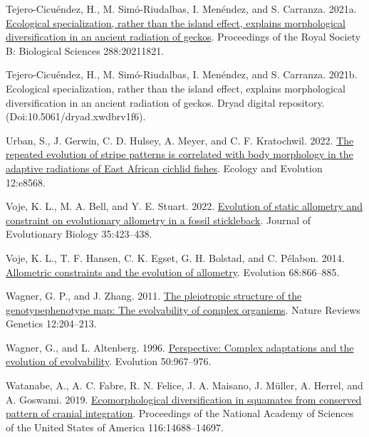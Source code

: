 \documentclass[
  11pt,
]{article}
\newlength{\cslhangindent}
\newlength{\cslentryspacingunit} %
\newenvironment{CSLReferences}[2] %
 {%
  \setlength{\parindent}{0pt}
  \ifodd #1
  \let\oldpar\par
  \def\par{\hangindent=\cslhangindent\oldpar}
  \fi
  \setlength{\parskip}{#2\cslentryspacingunit}
 }%
 {}
\begin{document}
\begin{CSLReferences}{1}{0}
\leavevmode{}%
Tejero-Cicuéndez, H., M. Simó-Riudalbas, I. Menéndez, and S. Carranza.
2021a. \href{https://doi.org/10.1098/rspb.2021.1821}{Ecological
specialization, rather than the island effect, explains morphological
diversification in an ancient radiation of geckos}. Proceedings of the
Royal Society B: Biological Sciences 288:20211821.

\leavevmode{}%
Tejero-Cicuéndez, H., M. Simó-Riudalbas, I. Menéndez, and S. Carranza.
2021b. Ecological specialization, rather than the island effect,
explains morphological diversification in an ancient radiation of
geckos. Dryad digital repository. (Doi:10.5061/dryad.xwdbrv1f6).

\leavevmode{}%
Urban, S., J. Gerwin, C. D. Hulsey, A. Meyer, and C. F. Kratochwil.
2022. \href{https://doi.org/10.1002/ece3.8568}{The repeated evolution of
stripe patterns is correlated with body morphology in the adaptive
radiations of {E}ast {A}frican cichlid fishes}. Ecology and Evolution
12:e8568.

\leavevmode{}%
Voje, K. L., M. A. Bell, and Y. E. Stuart. 2022.
\href{https://doi.org/10.1111/jeb.13984}{Evolution of static allometry
and constraint on evolutionary allometry in a fossil stickleback}.
Journal of Evolutionary Biology 35:423--438.

\leavevmode{}%
Voje, K. L., T. F. Hansen, C. K. Egset, G. H. Bolstad, and C. Pélabon.
2014. \href{https://doi.org/10.1111/evo.12312}{Allometric constraints
and the evolution of allometry}. Evolution 68:866--885.

\leavevmode{}%
Wagner, G. P., and J. Zhang. 2011.
\href{https://doi.org/10.1038/nrg2949}{The pleiotropic structure of the
genotype{\textendash}phenotype map: The evolvability of complex
organisms}. Nature Reviews Genetics 12:204--213.

\leavevmode{}%
Wagner, G., and L. Altenberg. 1996.
\href{https://doi.org/10.1111/j.1558-5646.1996.tb02339.x}{Perspective:
Complex adaptations and the evolution of evolvability}. Evolution
50:967--976.

\leavevmode{}%
Watanabe, A., A. C. Fabre, R. N. Felice, J. A. Maisano, J. Müller, A.
Herrel, and A. Goswami. 2019.
\href{https://doi.org/10.1073/pnas.1820967116}{{Ecomorphological
diversification in squamates from conserved pattern of cranial
integration}}. Proceedings of the National Academy of Sciences of the
United States of America 116:14688--14697.


\end{CSLReferences}
\end{document}
